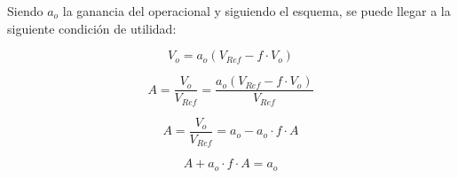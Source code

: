 \documentclass[]{article}
\begin{document}


Siendo $a_o$ la ganancia del operacional y siguiendo el esquema, se puede llegar a la siguiente condición de utilidad:

\begin{equation}
	V_o = a_o ( V_{Ref} - f \cdot V_o )
\end{equation}

\begin{equation}
	A = \frac{V_o}{V_{Ref}} = \frac{a_o ( V_{Ref} - f\cdot V_o )}{V_{Ref}} 
\end{equation}


\begin{equation}
	A = \frac{V_o}{V_{Ref}} = a_o - a_o \cdot f \cdot A
\end{equation}


\begin{equation}
	A + a_o \cdot f \cdot A  = a_o 
\end{equation}
\end{document}
